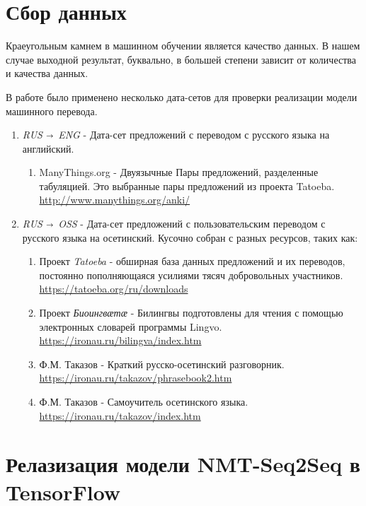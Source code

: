 	\section{Сбор данных}
	
	Краеугольным камнем в машинном обучении является качество данных. В нашем случае выходной результат, буквально, в большей степени зависит от количества и качества данных.
	
	В работе было применено несколько дата-сетов для проверки реализации модели машинного перевода.
	
	\begin{enumerate}
		\item \textit{RUS $\shortrightarrow$ ENG} - Дата-сет предложений с переводом с русского языка на английский.
		\begin{enumerate}
			\item ManyThings.org - Двуязычные Пары предложений, разделенные табуляцией. 
			Это выбранные пары предложений из проекта Tatoeba. \\ 
			\url{http://www.manythings.org/anki/}
		\end{enumerate}
		\item \textit{RUS $\shortrightarrow$ OSS} - Дата-сет предложений с пользовательским переводом с русского языка на осетинский.
		Кусочно собран с разных ресурсов, таких как:
		\begin{enumerate}
			 \item Проект \textit{Tatoeba} - обширная база данных предложений и их переводов, постоянно пополняющаяся усилиями тясяч добровольных участников. \\ \url{https://tatoeba.org/ru/downloads}
			 \item Проект \textit{Биоингвӕтӕ} - Билингвы подготовлены для чтения с помощью электронных словарей программы Lingvo. \\ \url{https://ironau.ru/bilingva/index.htm}
			 \item Ф.М. Таказов - Краткий русско-осетинский разговорник. \\ \url{https://ironau.ru/takazov/phrasebook2.htm}
			 \item Ф.М. Таказов - Самоучитель осетинского языка. \\ \url{https://ironau.ru/takazov/index.htm}
 		\end{enumerate}
	\end{enumerate}

    \newpage

	\section{Релазизация модели NMT-Seq2Seq в TensorFlow}
	
